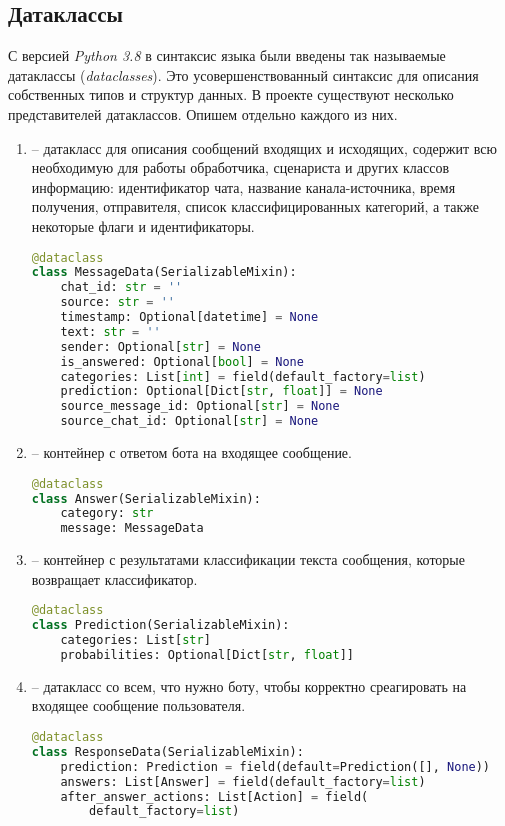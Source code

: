     \subsection{Датаклассы}
    С версией \textit{Python 3.8} в синтаксис языка были введены так называемые
    датаклассы (\textit{dataclasses}).
    Это усовершенствованный синтаксис для описания собственных типов и структур данных.
    В проекте существуют несколько представителей датаклассов. Опишем отдельно каждого из них.
    \begin{enumerate}
        \item {} -- датакласс для описания сообщений входящих и исходящих,
        содержит всю необходимую для работы обработчика, сценариста и других классов информацию:
        идентификатор чата, название канала-источника, время получения, отправителя,
        список классифицированных категорий, а также некоторые флаги и идентификаторы.
\begin{lstlisting}[language=Python]
@dataclass
class MessageData(SerializableMixin):
    chat_id: str = ''
    source: str = ''
    timestamp: Optional[datetime] = None
    text: str = ''
    sender: Optional[str] = None
    is_answered: Optional[bool] = None
    categories: List[int] = field(default_factory=list)
    prediction: Optional[Dict[str, float]] = None
    source_message_id: Optional[str] = None
    source_chat_id: Optional[str] = None
\end{lstlisting}

        \item {} -- контейнер с ответом бота на входящее сообщение.
\begin{lstlisting}[language=Python]
@dataclass
class Answer(SerializableMixin):
    category: str
    message: MessageData
\end{lstlisting}

        \item {} -- контейнер с результатами классификации текста сообщения,
        которые возвращает классификатор.
\begin{lstlisting}[language=Python]
@dataclass
class Prediction(SerializableMixin):
    categories: List[str]
    probabilities: Optional[Dict[str, float]]
\end{lstlisting}

        \item {} -- датакласс со всем, что нужно боту, чтобы корректно
        среагировать на входящее сообщение пользователя.
\begin{lstlisting}[language=Python]
@dataclass
class ResponseData(SerializableMixin):
    prediction: Prediction = field(default=Prediction([], None))
    answers: List[Answer] = field(default_factory=list)
    after_answer_actions: List[Action] = field(
        default_factory=list)
\end{lstlisting}
    \end{enumerate}

